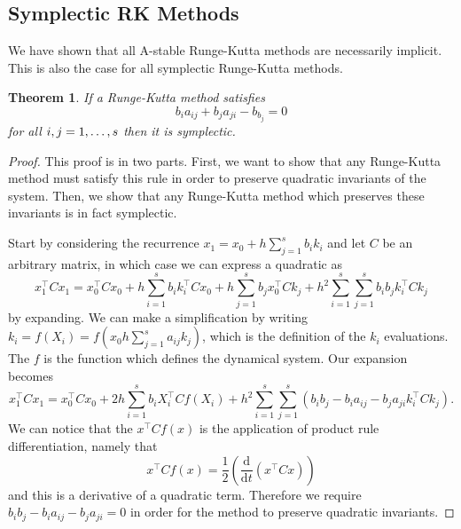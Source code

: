 \documentclass{report}
\newtheorem{theorem}{Theorem}[subsection]
\theoremstyle{exampstyle} \newtheorem{example}[theorem]{Example}
\theoremstyle{exampstyle} \newtheorem{remark}[theorem]{Remark}
\theoremstyle{exampstyle} \newtheorem{definition}[theorem]{Definition}
\theoremstyle{exampstyle} \newtheorem{lemma}[theorem]{Lemma}
\begin{document}

\subsection{Symplectic RK Methods}

We have shown that all A-stable Runge-Kutta methods are necessarily implicit.
This is also the case for all symplectic Runge-Kutta methods.

\begin{theorem}
If a Runge-Kutta method satisfies
\begin{equation}
	b_i a_{ij} + b_j a_{ji} - b_ b_j = 0
\end{equation}
for all $i, j = 1, \mathellipsis, s$ then it is symplectic.
\end{theorem}
\begin{proof}

This proof is in two parts. First, we want to show that any Runge-Kutta method must satisfy this rule in order to preserve quadratic invariants of the system.
Then, we show that any Runge-Kutta method which preserves these invariants is in fact symplectic.

Start by considering the recurrence $x_1 = x_0 + h \sum_{j=1}^{s} b_i k_i$ and let $C$ be an arbitrary matrix, in which case we can express a quadratic as
\begin{equation}
	x_1^\intercal C x_1 = x_0^\intercal C x_0 + h \sum_{i=1}^{s} b_i k_i^\intercal C x_0 + h \sum_{j=1}^{s} b_j x_0^\intercal C k_j + h^2 \sum_{i=1}^{s} \sum_{j=1}^{s} b_i b_j k_i^\intercal C k_j
\end{equation}
by expanding. We can make a simplification by writing $k_i = f(X_i) = f\left(x_0 h \sum_{j=1}^{s}a_{ij}k_j\right)$, which is the definition of the $k_i$ evaluations.
The $f$ is the function which defines the dynamical system.
Our expansion becomes
\begin{equation} %
	x_1^\intercal C x_1 = x_0^\intercal C x_0 + 2h \sum_{i=1}^{s} b_i X_i^\intercal C f(X_i) + h^2 \sum_{i=1}^{s} \sum_{j=1}^{s} (b_i b_j - b_i a_{ij} - b_j a_{ji}k_i^\intercal C k_j).
\end{equation}
We can notice that the $x^\intercal C f(x)$ is the application of product rule differentiation, namely that
\begin{equation*}
	x^\intercal C f(x) = \frac{1}{2} \left(\frac{\mathrm{d}}{\mathrm{d}t} (x^\intercal C x) \right)
\end{equation*}
and this is a derivative of a quadratic term.
Therefore we require $b_i b_j - b_i a_{ij} - b_j a_{ji} = 0$ in order for the method to preserve quadratic invariants.
\end{proof}
\end{document}
